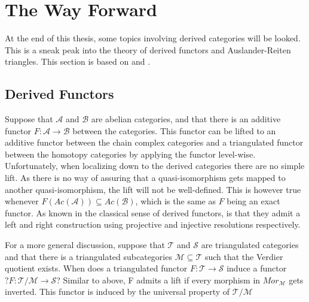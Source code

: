 \section{The Way Forward}

    At the end of this thesis, some topics involving derived categories will be looked. This is a sneak peak into the theory of derived functors and Auslander-Reiten triangles. This section is based on \cite{happel} and \cite{Kel96}. 

    \subsection{Derived Functors}

        Suppose that $\mathcal{A}$ and $\mathcal{B}$ are abelian categories, and that there is an additive functor $F:\mathcal{A}\rightarrow\mathcal{B}$ between the categories. This functor can be lifted to an additive functor between the chain complex categories and a triangulated functor between the homotopy categories by applying the functor level-wise. Unfortunately, when localizing down to the derived categories there are no simple lift. As there is no way of assuring that a quasi-isomorphism gets mapped to another quasi-isomorphism, the lift will not be well-defined. This is however true whenever $F(Ac(\mathcal{A}))\subseteq Ac(\mathcal{B})$, which is the same as $F$ being an exact functor. As known in the classical sense of derived functors, is that they admit a left and right construction using projective and injective resolutions respectively.

        \begin{center}
        \end{center}

        For a more general discussion, suppose that $\mathcal{T}$ and $\mathcal{S}$ are triangulated categories and that there is a triangulated subcategories $\mathcal{M}\subseteq\mathcal{T}$ such that the Verdier quotient exists. When does a triangulated functor $F:\mathcal{T}\rightarrow\mathcal{S}$ induce a functor $?F : \mathcal{T}/\mathcal{M}\rightarrow \mathcal{S}$? Similar to above, F admits a lift if every morphism in $Mor_{\mathcal{M}}$ gets inverted. This functor is induced by the universal property of $\mathcal{T}/\mathcal{M}$

